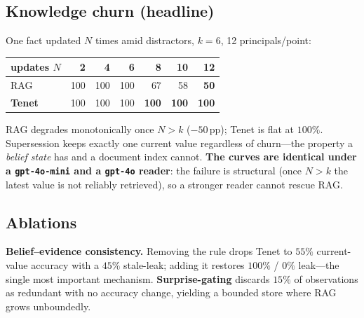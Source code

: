 \documentclass[11pt]{article}
\begin{document}
\subsection{Knowledge churn (headline)}
\label{sec:churn}
One fact updated $N$ times amid distractors, $k=6$, 12 principals/point:
\begin{center}\small
\begin{tabular}{lrrrrrr}
\toprule
updates $N$ & 2 & 4 & 6 & 8 & 10 & 12 \\
\midrule
RAG            & 100 & 100 & 100 & 67 & 58 & \textbf{50} \\
\textbf{Tenet} & 100 & 100 & 100 & \textbf{100} & \textbf{100} & \textbf{100} \\
\bottomrule
\end{tabular}
\end{center}
RAG degrades monotonically once $N>k$ ($-50$\,pp); Tenet is flat at $100\%$. Supersession
keeps exactly one current value regardless of churn---the property a \emph{belief state} has
and a document index cannot. \textbf{The curves are identical under a \texttt{gpt-4o-mini} and a \texttt{gpt-4o} reader}: the failure is structural (once $N>k$ the latest value is not reliably retrieved), so a stronger reader cannot rescue RAG.

\subsection{Ablations}
\label{sec:abl}
\textbf{Belief--evidence consistency.} Removing the rule drops Tenet to $55\%$ current-value
accuracy with a $45\%$ stale-leak; adding it restores $100\%$ / $0\%$ leak---the single most
important mechanism. \textbf{Surprise-gating} discards $15\%$ of observations as redundant
with no accuracy change, yielding a bounded store where RAG grows unboundedly.
\end{document}
